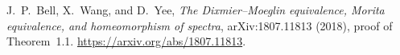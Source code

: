 J.~P.~Bell, X.~Wang, and D.~Yee,
\emph{The Dixmier--Moeglin equivalence, Morita equivalence, and homeomorphism of spectra},
arXiv:1807.11813 (2018), proof of Theorem~1.1.
\url{https://arxiv.org/abs/1807.11813}.
